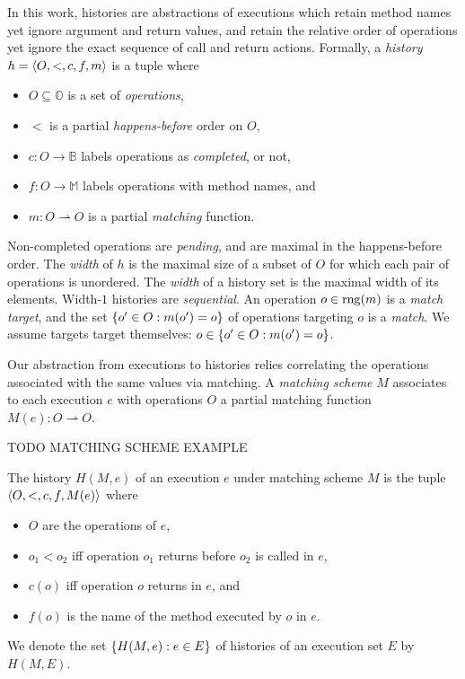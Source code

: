 In this work, histories are abstractions of executions which retain method
names yet ignore argument and return values, and retain the relative order of
operations yet ignore the exact sequence of call and return actions. Formally,
a \emph{history} $h = {\left\langle{O,<,c,f,m}\right\rangle}$ is a tuple where
\begin{itemize}

  \item $O \subseteq \mathbb{O}$ is a set of \emph{operations},

  \item $<$ is a partial \emph{happens-before} order on $O$,

  \item $c: O \to \mathbb{B}$ labels operations as \emph{completed}, or not,

  \item $f: O \to \mathbb{M}$ labels operations with method names, and

  \item $m: O \rightharpoonup O$ is a partial \emph{matching} function.

\end{itemize}
Non-completed operations are \emph{pending}, and are maximal in the
happens-before order. The \emph{width} of $h$ is the maximal size of a
subset of $O$ for which each pair of operations is unordered. The \emph{width}
of a history set is the maximal width of its elements. Width-$1$ histories are
\emph{sequential}. An operation $o \in \operatorname{rng}(m)$ is a \emph{match target}, and
the set ${\{{ o' \in O : m(o') = o}\}}$ of operations targeting $o$ is a
\emph{match}. We assume targets target themselves: $o \in {\{{ o' \in O :
m(o') = o}\}}$.

Our abstraction from executions to histories relies correlating the operations
associated with the same values via matching. A \emph{matching scheme} $M$
associates to each execution $e$ with operations $O$ a partial matching
function $M(e): O \rightharpoonup O$.

\begin{example}

  TODO MATCHING SCHEME EXAMPLE

\end{example}

The history $H(M,e)$ of an execution $e$ under matching scheme $M$ is the tuple
${\left\langle{O,<,c,f,M(e)}\right\rangle}$ where
\begin{itemize}

  \item $O$ are the operations of $e$,

  \item $o_1 < o_2$ if{f} operation $o_1$ returns before $o_2$ is called in $e$,

  \item $c(o)$ if{f} operation $o$ returns in $e$, and

  \item $f(o)$ is the name of the method executed by $o$ in $e$.

\end{itemize}
We denote the set ${\{{H(M,e) : e \in E}\}}$ of histories of an execution set $E$
by $H(M,E)$.

